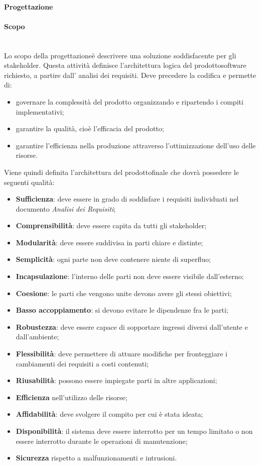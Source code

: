 		\paragraph{Progettazione}
			\paragraph*{Scopo}\mbox{}\\ [1mm]
			Lo scopo della progettazione\glosp è descrivere una soluzione soddisfacente per gli stakeholder\glo. Questa attività definisce l'architettura logica del prodotto\glosp software richiesto, a partire dall' analisi dei requisiti. 
			Deve precedere la codifica e permette di: 
			\begin{itemize}
				\item governare la complessità del prodotto organizzando e ripartendo i compiti implementativi;
				\item garantire la qualità, cioè l'efficacia del prodotto;
				\item garantire l'efficienza nella produzione attraverso l'ottimizzazione dell'uso delle risorse.
			\end{itemize}
			Viene quindi definita l'architettura del prodotto\glosp finale che dovrà possedere le seguenti qualità:
			\begin{itemize}
				\item \textbf{Sufficienza}: deve essere in grado di soddisfare i requisiti individuati nel documento \textit{Analisi dei Requisiti};
				\item \textbf{Comprensibilità}: deve essere capita da tutti gli stakeholder\glo;
				\item \textbf{Modularità}: deve essere suddivisa in parti chiare e distinte;
				\item \textbf{Semplicità}: ogni parte non deve contenere niente di superfluo;
				\item \textbf{Incapsulazione}: l'interno delle parti non deve essere visibile dall'esterno;
				\item \textbf{Coesione}: le parti che vengono unite devono avere gli stessi obiettivi;
				\item \textbf{Basso accoppiamento}: si devono evitare le dipendenze fra le parti;
				\item \textbf{Robustezza}: deve essere capace di sopportare ingressi diversi dall'utente e dall'ambiente;
				\item \textbf{Flessibilità}: deve permettere di attuare modifiche per fronteggiare i cambiamenti dei requisiti a costi contenuti; 
				\item \textbf{Riusabilità}: possono essere impiegate parti in altre applicazioni;
				\item \textbf{Efficienza} nell'utilizzo delle risorse;
				\item \textbf{Affidabilità}: deve svolgere il compito per cui è stata ideata;
				\item \textbf{Disponibilità}: il sistema deve essere interrotto per un tempo limitato o non essere interrotto durante le operazioni di manutenzione;
				\item \textbf{Sicurezza} rispetto a malfunzionamenti e intrusioni.	
			\end{itemize}
